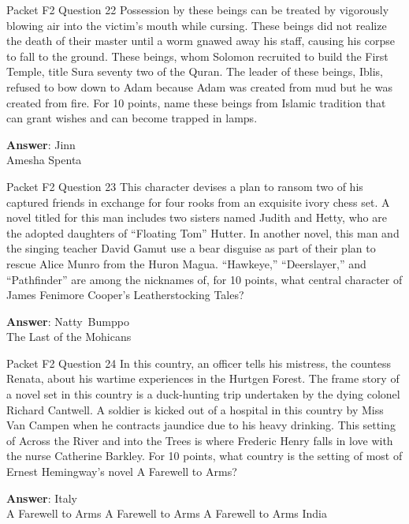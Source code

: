 \begin{frame}{Packet F2 Question 22}
Possession by these beings can be treated by vigorously blowing air into the victim’s mouth while cursing. These beings did not realize the death of their master until a worm gnawed away his staff, causing his corpse to fall to the ground. These   beings, whom Solomon recruited to build   the First Temple, title Sura seventy two of the Quran. The leader of these beings, Iblis, refused   to bow down to Adam because Adam was created from mud but he was created from fire. For 10 points, name these beings from Islamic tradition that can grant wishes and can become trapped in lamps.  

\textbf{Answer}: Jinn\\
 Amesha Spenta
\end{frame}

\begin{frame}{Packet F2 Question 23}
This character devises a plan to ransom two of his captured friends in exchange for   four rooks from an exquisite ivory chess set. A novel titled   for this man includes   two sisters named Judith and Hetty, who are the adopted daughters of “Floating Tom” Hutter. In another novel, this man and the singing teacher David Gamut use a bear disguise as part of their plan to rescue Alice Munro from the Huron Magua.   “Hawkeye,” “Deerslayer,” and “Pathfinder” are among the nicknames of, for 10 points, what central character of James   Fenimore Cooper’s Leatherstocking Tales?

\textbf{Answer}: Natty\ Bumppo\\
 The Last of the Mohicans
\end{frame}

\begin{frame}{Packet F2 Question 24}
In this country, an officer   tells his mistress, the countess Renata, about his wartime experiences in the Hurtgen Forest. The frame story of a   novel set in this country is a duck-hunting trip undertaken by the dying colonel Richard Cantwell. A soldier is kicked out of a hospital in this country by Miss Van Campen when he contracts jaundice due to his heavy drinking. This setting of Across the River and into the Trees is where Frederic Henry falls in love with the nurse Catherine   Barkley. For 10 points,   what country is the setting of most of Ernest Hemingway’s novel A Farewell to Arms?    

\textbf{Answer}: Italy\\
 A Farewell to Arms
 A Farewell to Arms
 A Farewell to Arms
 India
\end{frame}

